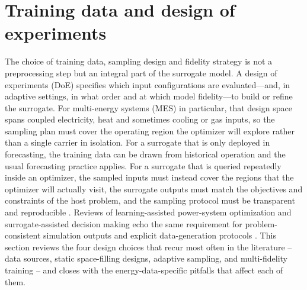\section{Training data and design of experiments}
\label{sec:doe}

The choice of training data, sampling design and fidelity strategy is
not a preprocessing step but an integral part of the surrogate model.
A design of experiments (DoE) specifies which input
configurations are evaluated---and, in adaptive settings, in what
order and at which model fidelity---to build or refine the
surrogate. For multi-energy systems (MES) in particular, that design
space spans coupled electricity, heat and sometimes cooling or gas
inputs, so the sampling plan must cover the operating region the
optimizer will explore rather than a single carrier in isolation.
For a surrogate that is only deployed in forecasting, the training
data can be drawn from historical operation and the usual forecasting
practice applies. For a surrogate that is queried repeatedly inside an
optimizer, the sampled inputs must instead cover the regions that the
optimizer will actually visit, the surrogate outputs must match the
objectives and constraints of the host problem, and the sampling
protocol must be transparent and reproducible
\cite{Perera2019191,Ruan2021221}. Reviews of learning-assisted
power-system optimization and surrogate-assisted decision making echo
the same requirement for problem-consistent simulation outputs and
explicit data-generation protocols
\cite{Khaloie2025,Lim2025,Ruan2021221}.
This section reviews the four design choices that recur most often in
the literature -- data sources, static space-filling designs, adaptive
sampling, and multi-fidelity training -- and closes with the
energy-data-specific pitfalls that affect each of them.

